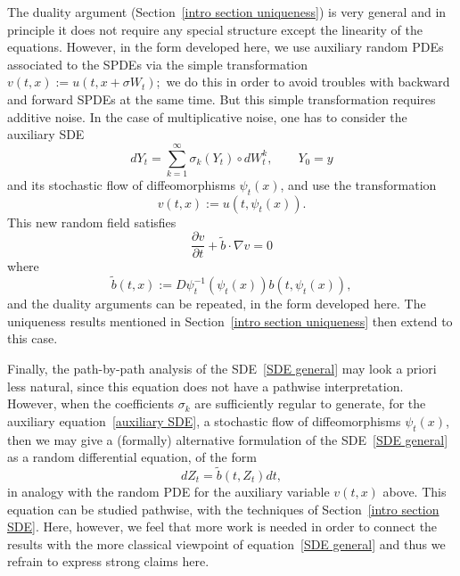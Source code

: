 \documentclass[a4paper,10pt]{article}
\newcommand{\td}{\tilde}
\begin{document}
The duality argument (Section~\ref{intro section uniqueness}) is very
general and in principle it does not require any special structure except
the linearity of the equations. However, in the form developed here, we use
auxiliary random PDEs associated to the SPDEs via the simple transformation $ 
v( t,x) :=u( t,x+\sigma W_{t}) $;\ we do this in order
to avoid troubles with backward and forward SPDEs at the same time. But this
simple transformation requires additive noise. In the case of multiplicative
noise, one has to consider the auxiliary SDE 
\begin{equation}
dY_{t}=\sum_{k=1}^{\infty }\sigma _{k}( Y_{t}) \circ
dW_{t}^{k},\qquad Y_{0}=y  \label{auxiliary SDE}
\end{equation} 
and its stochastic flow of diffeomorphisms $\psi _{t}( x) $, and
use the transformation 
\begin{equation*}
v( t,x) :=u( t,\psi _{t}( x) ) .
\end{equation*} 
This new random field satisfies 
\begin{equation*}
\frac{\partial v}{\partial t}+\widetilde{b}\cdot \nabla v=0
\end{equation*} 
where
\begin{equation*}
\td{b}(t,x):=D\psi^{-1}_t(\psi_t(x))b(t,\psi_t(x)),
\end{equation*}
and the duality arguments can be repeated, in the form developed
here. The uniqueness results mentioned in Section~\ref{intro section
uniqueness} then extend to this case.

Finally, the path-by-path analysis of the SDE~\eqref{SDE general} may look a
priori less natural, since this equation does not have a pathwise
interpretation. However, when the coefficients $\sigma _{k}$ are
sufficiently regular to generate, for the auxiliary equation~\eqref{auxiliary
SDE}, a stochastic flow of diffeomorphisms $\psi _{t}( x) $, then
we may give a (formally) alternative formulation of the SDE~\eqref{SDE
general} as a random differential equation, of the form
\begin{equation*}
dZ_t=\td{b}(t,Z_t)dt,
\end{equation*}
in analogy with the random PDE for the auxiliary variable $v(
t,x) $ above. This equation can be studied pathwise, with the
techniques of Section~\ref{intro section SDE}. Here, however, we feel that
more work is needed in order to connect the results with the more classical
viewpoint of equation~\eqref{SDE general} and thus we refrain to express
strong claims here.
\end{document}
